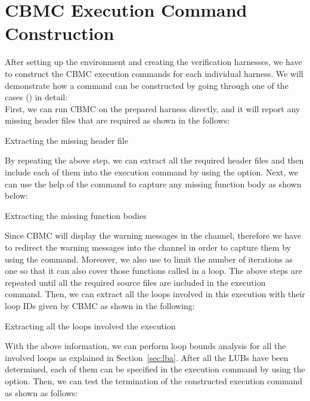 \section{CBMC Execution Command Construction} \label{sec:cbmcc}
After setting up the environment and creating the verification harnesses, we have to construct the CBMC execution commands for each individual harness. We will demonstrate how a command can be constructed by going through one of the cases () in detail:\\

First, we can run CBMC on the prepared harness directly, and it will report any missing header files that are required as shown in the follows:
\begin{listing}[htp]
\caption{Extracting the missing header file}
\label{lbl:step1}
\end{listing}

By repeating the above step, we can extract all the required header files and then include each of them into the execution command by using the  option. Next, we can use the help of the  command to capture any missing function body as shown below:

\begin{listing}[htp]
\caption{Extracting the missing function bodies}
\end{listing}

Since CBMC will display the warning messages in the  channel, therefore we have to redirect the warning messages into the  channel in order to capture them by using the  command. Moreover, we also use  to limit the number of iterations as one so that it can also cover those functions called in a loop. The above steps are repeated until all the required source files are included in the execution command. Then, we can extract all the loops involved in this execution with their loop IDs given by CBMC as shown in the following:

\begin{listing}[htp]
\caption{Extracting all the loops involved the execution}
\end{listing}

With the above information, we can perform loop bounds analysis for all the involved loops as explained in Section~\ref{sec:lba}. After all the LUBs have been determined, each of them can be specified in the execution command by using the  option. Then, we can test the termination of the constructed execution command as shown as follows:

